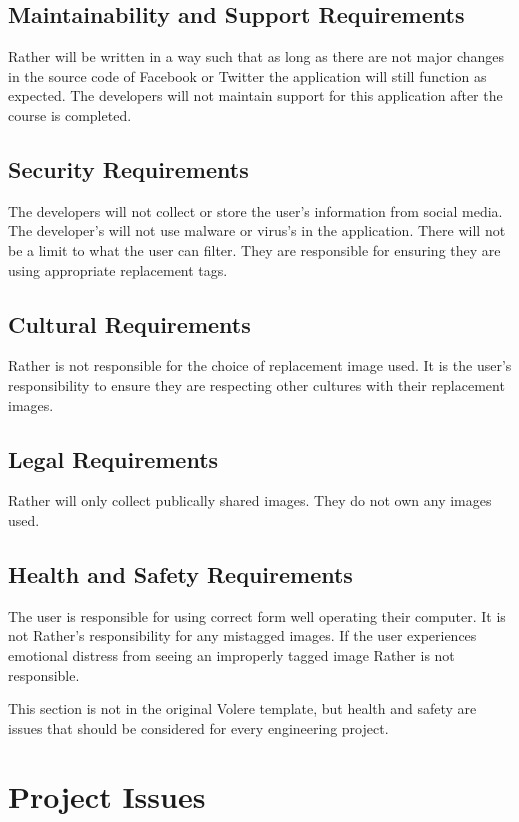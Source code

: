 \documentclass[12pt, titlepage]{article}
\begin{document}
\subsection{Maintainability and Support Requirements}
Rather will be written in a way such that as long as there are not major changes in the source code of Facebook or Twitter the application will still function as expected. The developers will not maintain support for this application after the course is completed.

\subsection{Security Requirements}
The developers will not collect or store the user's information from social media. The developer's will not use malware or virus's %
in the application. There will not be a limit to what the user can filter. They are responsible for ensuring they are using appropriate replacement tags. 

\subsection{Cultural Requirements}
Rather is not responsible for the choice of replacement image used. It is the user's responsibility to ensure they are respecting other cultures with their replacement images.

\subsection{Legal Requirements}
Rather will only collect publically shared images. They do not own any images used. 

\subsection{Health and Safety Requirements}
The user is responsible for using correct form well operating their computer. It is not Rather's responsibility for any mistagged images. If the user experiences emotional distress from seeing an improperly tagged image Rather is not responsible. 

This section is not in the original Volere template, but health and safety are
issues that should be considered for every engineering project.

\section{Project Issues}
\end{document}
